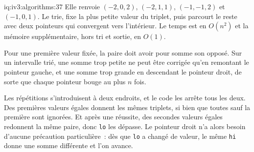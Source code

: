 \begin{solution}{iq:iv3:algorithms:37}
Elle renvoie $(-2, 0, 2)$, $(-2, 1, 1)$, $(-1, -1, 2)$ et $(-1, 0, 1)$. Le  trie, fixe la plus petite valeur du triplet, puis parcourt le reste avec deux pointeurs qui convergent vers l'intérieur. Le temps est en $O(n^2)$ et la mémoire supplémentaire, hors tri et sortie, en $O(1)$.
\label{lst:iv3:al:threesum}

Pour une première valeur fixée, la paire doit avoir pour somme son opposé. Sur un intervalle trié, une somme trop petite ne peut être corrigée qu'en remontant le pointeur gauche, et une somme trop grande en descendant le pointeur droit, de sorte que chaque pointeur bouge au plus $n$ fois.

Les répétitions s'introduisent à deux endroits, et le code les arrête tous les deux. Des premières valeurs égales donnent les mêmes triplets, si bien que toutes sauf la première sont ignorées. Et après une réussite, des secondes valeurs égales redonnent la même paire, donc \texttt{lo} les dépasse. Le pointeur droit n'a alors besoin d'aucune précaution particulière~: dès que \texttt{lo} a changé de valeur, le même \texttt{hi} donne une somme différente et l'on avance.

\end{solution}

